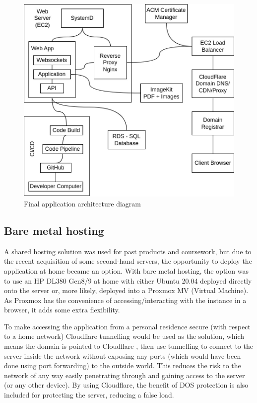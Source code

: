 \begin{figure}[H]
\centering
\includegraphics[scale=0.30]{images/architecture_diagram.jpg}
\caption{Final application architecture diagram}
\label{fig:figure2}
\end{figure}

\subsection{Bare metal hosting}
A shared hosting solution was used for past products and coursework, but due to the recent acquisition of some second-hand servers, the opportunity to deploy the application at home became an option. With bare metal hosting, the option was to use an HP DL380 Gen8/9 at home with either Ubuntu 20.04 deployed directly onto the server or, more likely, deployed into a Proxmox MV (Virtual Machine). As Proxmox has the convenience of accessing/interacting with the instance in a browser, it adds some extra flexibility.

To make accessing the application from a personal residence secure (with respect to a home network) Cloudflare tunnelling would be used as the solution, which means the domain is pointed to Cloudflare \cite{cloud_flare}, then use tunnelling to connect to the server inside the network without exposing any ports (which would have been done using port forwarding) to the outside world. This reduces the risk to the network of any way easily penetrating through and gaining access to the server (or any other device). By using Cloudflare, the benefit of DOS protection is also included for protecting the server, reducing a false load.

